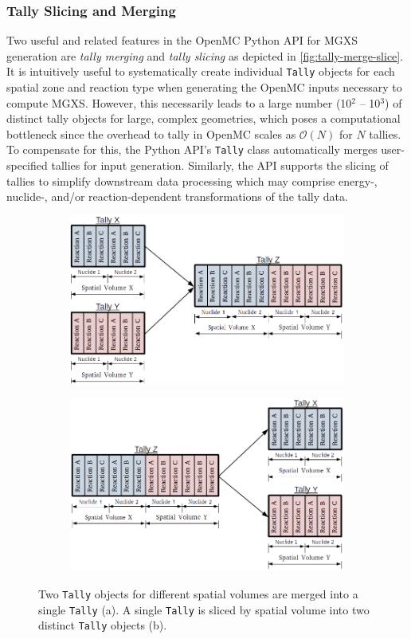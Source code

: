 \subsubsection{Tally Slicing and Merging}
\label{subsubsec:tally-slice-merge}

Two useful and related features in the OpenMC Python API for MGXS generation are \textit{tally merging} and \textit{tally slicing} as depicted in \autoref{fig:tally-merge-slice}. It is intuitively useful to systematically create individual \texttt{Tally} objects for each spatial zone and reaction type when generating the OpenMC inputs necessary to compute MGXS. However, this necessarily leads to a large number (10$^2$ -- 10$^3$) of distinct tally objects for large, complex geometries, which poses a computational bottleneck since the overhead to tally in OpenMC scales as $\mathcal{O}(N)$ for $N$ tallies. To compensate for this, the Python API's \texttt{Tally} class automatically merges user-specified tallies for input generation. Similarly, the API supports the slicing of tallies to simplify downstream data processing which may comprise energy-, nuclide-, and/or reaction-dependent transformations of the tally data.

\begin{figure}
\begin{subfigure}{\textwidth}
  \centering
  \includegraphics[width=0.6\linewidth]{figures/tally-merge}
  \caption{}
\end{subfigure}
\begin{subfigure}{\textwidth}
  \centering
  \includegraphics[width=0.6\linewidth]{figures/tally-slice}
  \caption{}
\end{subfigure}
\caption{Two \texttt{Tally} objects for different spatial volumes are merged into a single \texttt{Tally} (a). A single \texttt{Tally} is sliced by spatial volume into two distinct \texttt{Tally} objects (b).}
\label{fig:tally-merge-slice}
\end{figure}

